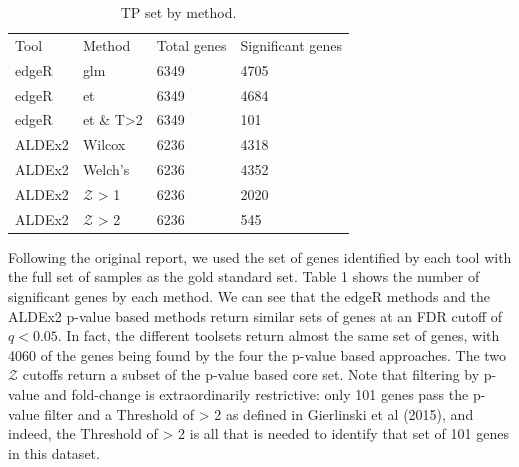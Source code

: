 \documentclass[onecolumn]{article}
\begin{document}
\begin{longtable}[]{@{}llll@{}}
\caption{TP set by method.}\tabularnewline
\toprule
\endhead
Tool & Method & Total genes & Significant genes\tabularnewline
edgeR & glm & 6349 & 4705\tabularnewline
edgeR & et & 6349 & 4684\tabularnewline
edgeR & et \& T\textgreater{}2 & 6349 & 101\tabularnewline
ALDEx2 & Wilcox & 6236 & 4318\tabularnewline
ALDEx2 & Welch's & 6236 & 4352\tabularnewline
ALDEx2 & \(\mathcal{Z}\) \textgreater{} 1 & 6236 & 2020\tabularnewline
ALDEx2 & \(\mathcal{Z}\) \textgreater{} 2 & 6236 & 545\tabularnewline
\bottomrule
\end{longtable}

Following the original report, we used the set of genes identified by
each tool with the full set of samples as the gold standard set. Table 1
shows the number of significant genes by each method. We can see that
the edgeR methods and the ALDEx2 p-value based methods return similar
sets of genes at an FDR cutoff of \(q < 0.05\). In fact, the different
toolsets return almost the same set of genes, with 4060 of the genes
being found by the four the p-value based approaches. The two
\(\mathcal{Z}\) cutoffs return a subset of the p-value based core set.
Note that filtering by p-value and fold-change is extraordinarily
restrictive: only 101 genes pass the p-value filter and a Threshold of
\textgreater{} 2 as defined in Gierlinski et al (2015), and indeed, the
Threshold of \textgreater{} 2 is all that is needed to identify that set
of 101 genes in this dataset.

\clearpage
\end{document}
